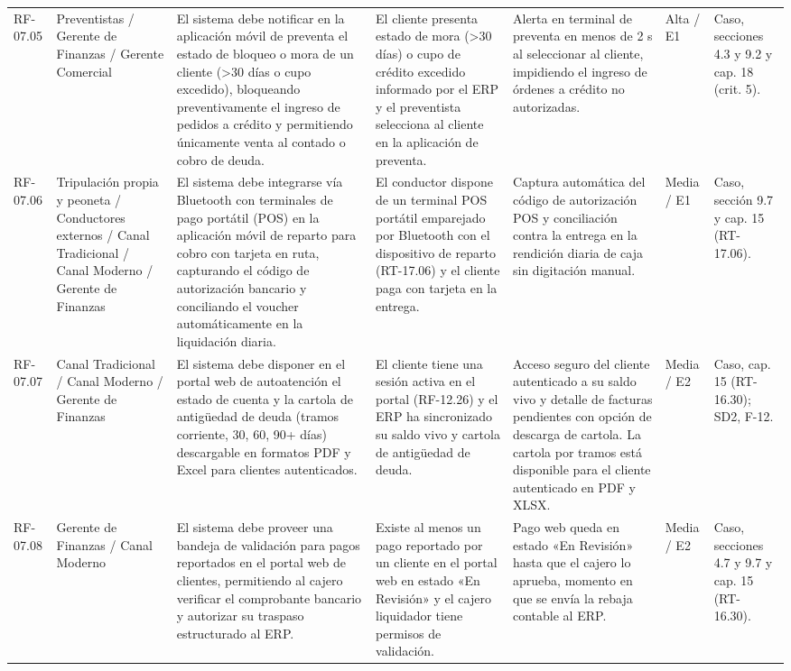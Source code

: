 {\begin{longtable}{@{}F{0.062} F{0.080} F{0.195} F{0.160} F{0.240} F{0.093} F{0.170}@{}}
  RF-07.05 & Preventistas / Gerente de Finanzas / Gerente Comercial & El sistema debe notificar en la aplicación móvil de preventa el estado de bloqueo o mora de un cliente (>30 días o cupo excedido), bloqueando preventivamente el ingreso de pedidos a crédito y permitiendo únicamente venta al contado o cobro de deuda. & El cliente presenta estado de mora (>30 días) o cupo de crédito excedido informado por el ERP y el preventista selecciona al cliente en la aplicación de preventa. & Alerta en terminal de preventa en menos de 2 s al seleccionar al cliente, impidiendo el ingreso de órdenes a crédito no autorizadas. & Alta / E1 & Caso, secciones 4.3 y 9.2 y cap. 18 (crit. 5). \\
  RF-07.06 & Tripulación propia y peoneta / Conductores externos / Canal Tradicional / Canal Moderno / Gerente de Finanzas & El sistema debe integrarse vía Bluetooth con terminales de pago portátil (POS) en la aplicación móvil de reparto para cobro con tarjeta en ruta, capturando el código de autorización bancario y conciliando el voucher automáticamente en la liquidación diaria. & El conductor dispone de un terminal POS portátil emparejado por Bluetooth con el dispositivo de reparto (RT-17.06) y el cliente paga con tarjeta en la entrega. & Captura automática del código de autorización POS y conciliación contra la entrega en la rendición diaria de caja sin digitación manual. & Media / E1 & Caso, sección 9.7 y cap. 15 (RT-17.06). \\
  RF-07.07 & Canal Tradicional / Canal Moderno / Gerente de Finanzas & El sistema debe disponer en el portal web de autoatención el estado de cuenta y la cartola de antigüedad de deuda (tramos corriente, 30, 60, 90+ días) descargable en formatos PDF y Excel para clientes autenticados. & El cliente tiene una sesión activa en el portal (RF-12.26) y el ERP ha sincronizado su saldo vivo y cartola de antigüedad de deuda. & Acceso seguro del cliente autenticado a su saldo vivo y detalle de facturas pendientes con opción de descarga de cartola. La cartola por tramos está disponible para el cliente autenticado en PDF y XLSX. & Media / E2 & Caso, cap. 15 (RT-16.30); SD2, F-12. \\
  RF-07.08 & Gerente de Finanzas / Canal Moderno & El sistema debe proveer una bandeja de validación para pagos reportados en el portal web de clientes, permitiendo al cajero verificar el comprobante bancario y autorizar su traspaso estructurado al ERP. & Existe al menos un pago reportado por un cliente en el portal web en estado «En Revisión» y el cajero liquidador tiene permisos de validación. & Pago web queda en estado «En Revisión» hasta que el cajero lo aprueba, momento en que se envía la rebaja contable al ERP. & Media / E2 & Caso, secciones 4.7 y 9.7 y cap. 15 (RT-16.30). \\

\end{longtable}}
